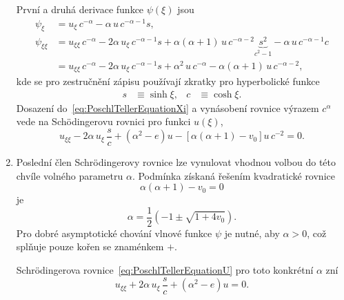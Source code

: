 \begin{solution}
\begin{enumerate}
        První a druhá derivace funkce $\psi(\xi)$ jsou
        \begin{subequations}
            \begin{align}
                \psi_{\xi}&=u_{\xi}\,c^{-\alpha}-\alpha\,u\,c^{-\alpha-1}s,\\
                \psi_{\xi\xi}&=u_{\xi\xi}\,c^{-\alpha}-2\alpha\,u_{\xi}\,c^{-\alpha-1}s+\alpha(\alpha+1)\,u\,c^{-\alpha-2}\underbrace{s^{2}}_{c^{2}-1}-\alpha\,u\,c^{-\alpha-1}c\nonumber\\
                &=u_{\xi\xi}\,c^{-\alpha}-2\alpha\,u_{\xi}\,c^{-\alpha-1}s+\alpha^{2}\,u\,c^{-\alpha}-\alpha(\alpha+1)\,u\,c^{-\alpha-2},
            \end{align}            
        \end{subequations}
        kde se pro zestručnění zápisu používají zkratky pro hyperbolické funkce
        \begin{align}
            s&\equiv\sinh\xi,
            &c&\equiv\cosh\xi.
        \end{align}
        Dosazení do~\eqref{eq:PoschlTellerEquationXi} a vynásobení rovnice výrazem $c^{\alpha}$ vede na Schödingerovu rovnici pro funkci $u(\xi)$,
        \begin{equation}
            \label{eq:PoschlTellerEquationU}
            u_{\xi\xi}-2\alpha\,u_{\xi}\,\frac{s}{c}+\left(\alpha^{2}-e\right)u-\left[\alpha(\alpha+1)-v_{0}\right]u\,c^{-2}=0.
        \end{equation}

    \item
        Poslední člen Schrödingerovy rovnice lze vynulovat vhodnou volbou do této chvíle volného parametru $\alpha$.
        Podmínka získaná řešením kvadratické rovnice
        \begin{equation}
            \alpha(\alpha+1)-v_{0}=0
        \end{equation}
        je
        \begin{equation}
            \label{eq:PoschlTellerAlpha}
            \alpha=\frac{1}{2}\left(-1\pm\sqrt{1+4v_{0}}\right).
        \end{equation}
        Pro dobré asymptotické chování vlnové funkce $\psi$ je nutné, aby $\alpha>0$, což splňuje pouze kořen se znaménkem $+$.

        Schrödingerova rovnice~\eqref{eq:PoschlTellerEquationU} pro toto konkrétní $\alpha$ zní
        \begin{equation}
            u_{\xi\xi}+2\alpha\,u_{\xi}\,\frac{s}{c}+\left(\alpha^{2}-e\right)u=0.
        \end{equation}


\end{enumerate}
\end{solution}
